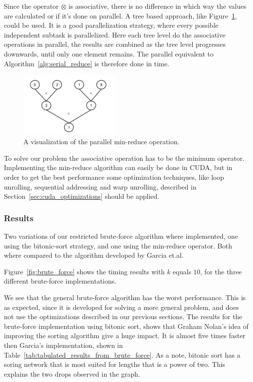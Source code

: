 Since the operator $\otimes$ is associative, there is no difference in which way the values are calculated or if it's done on parallel. A tree based approach, like Figure~\ref{fig:paralell_reduce_operation}, could be used. It is a good parallelization strategy, where every possible independent subtask is parallelized. Here each tree level do the associative operations in parallel, the results are combined as the tree level progresses downwards, until only one element remains. The parallel equivalent to Algorithm~\ref{alg:serial_reduce} is therefore done in  time. 

\begin{figure}[ht!]
\centering
\includegraphics[width=50mm]{../gfx/min_reduce.png}
\caption{A visualization of the parallel min-reduce operation.}
\label{fig:paralell_reduce_operation}
\end{figure}

To solve our problem the associative operation has to be the minimum operator. Implementing the min-reduce algorithm can easily be done in CUDA, but in order to get the best performance some optimization techniques, like loop unrolling, sequential addressing and warp unrolling, described in Section~\ref{sec:cuda_optimizations} should be applied.   

\subsubsection{Results} %
\label{ssub:comparison}

Two variations of our restricted brute-force algorithm where implemented, one using the bitonic-sort strategy, and one using the min-reduce operator. Both where compared to the algorithm developed by Garcia et.al.

Figure~\ref{fig:brute_force} shows the timing results with $k$ equals $10$, for the three different brute-force implementations.

We see that the general brute-force algorithm has the worst performance. This is as expected, since it is developed for solving a more general problem, and does not use the optimizations described in our previous sections. The results for the brute-force implementation using bitonic sort, shows that Graham Nolan's idea of improving the sorting algorithm give a huge impact. It is almost five times faster then Garcia's implementation, shown in Table~\ref{tab:tabulated_results_from_brute_force}. As a note, bitonic sort has a soring network that is most suited for lengths that is a power of two. This explains the two drops observed in the graph.

